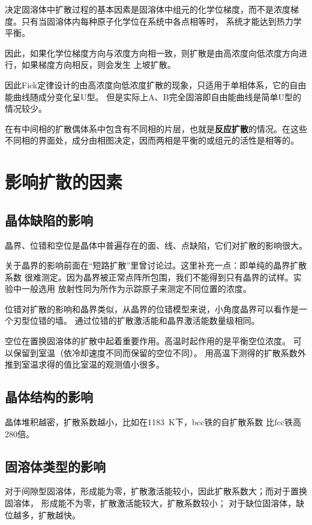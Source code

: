         决定固溶体中扩散过程的基本因素是固溶体中组元的化学位梯度，而不是浓度梯度。只有当固溶体内每种原子化学位在系统中各点相等时，
        系统才能达到热力学平衡。

        因此，如果化学位梯度方向与浓度方向相一致，则扩散是由高浓度向低浓度方向进行，如果梯度方向相反，则会发生
        上坡扩散。

        因此Fick定律设计的由高浓度向低浓度扩散的现象，只适用于单相体系，它的自由能曲线随成分变化呈U型。
        但是实际上A、B完全固溶即自由能曲线是简单U型的情况较少。

        在有中间相的扩散偶体系中包含有不同相的片层，也就是\textbf{反应扩散}的情况。在这些不同相的界面处，成分由相图决定，因而两相是平衡的或组元的活性是相等的。

    \section{影响扩散的因素}
        \subsection{晶体缺陷的影响}
            晶界、位错和空位是晶体中普遍存在的面、线、点缺陷，它们对扩散的影响很大。
            
            关于晶界的影响前面在“短路扩散”里曾讨论过。这里补充一点：即单纯的晶界扩散系数
            很难测定。因为晶界被正常点阵所包围，我们不能得到只有晶界的试样。实验中一般选用
            放射性同为所作为示踪原子来测定不同位置的浓度。

            位错对扩散的影响和晶界类似，从晶界的位错模型来说，小角度晶界可以看作是一个刃型位错的墙。
            通过位错的扩散激活能和晶界激活能数量级相同。

            空位在置换固溶体的扩散中起着重要作用。高温时起作用的是平衡空位浓度。
            可以保留到室温（依冷却速度不同而保留的空位不同）。
            用高温下测得的扩散系数外推到室温求得的值比室温的观测值小很多。
        \subsection{晶体结构的影响}
            晶体堆积越密，扩散系数越小，比如在\SI{1183}{\K}下，bcc铁的自扩散系数
            比fcc铁高280倍。
        \subsection{固溶体类型的影响}
            对于间隙型固溶体，形成能为零，扩散激活能较小，因此扩散系数大；而对于置换固溶体，
            形成能不为零，扩散激活能较大，扩散系数较小；
            对于缺位固溶体，缺位越多，扩散越快。
